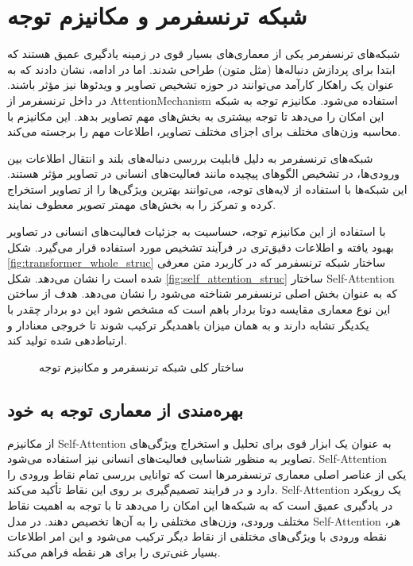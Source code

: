 \section{شبکه ترنسفرمر و مکانیزم توجه}

شبکه‌های ترنسفرمر یکی از معماری‌های بسیار قوی در زمینه یادگیری عمیق هستند که ابتدا برای پردازش دنباله‌ها (مثل متون) طراحی شدند.
\cite{AttentionIsAllNeed}
 اما در ادامه، نشان دادند که به عنوان یک راهکار کارآمد می‌توانند در حوزه تشخیص تصاویر و ویدئوها نیز مؤثر باشند. در داخل ترنسفرمر از %
\gls{AttentionMechanism}
استفاده می‌شود.
مکانیزم توجه به شبکه این امکان را می‌دهد تا توجه بیشتری به بخش‌های مهم تصاویر بدهد. این مکانیزم با محاسبه وزن‌های مختلف برای اجزای مختلف تصاویر، اطلاعات مهم را برجسته می‌کند. 

شبکه‌های ترنسفرمر به دلیل قابلیت بررسی دنباله‌های بلند و انتقال اطلاعات بین ورودی‌ها، در تشخیص الگوهای پیچیده مانند فعالیت‌های انسانی در تصاویر مؤثر هستند. این شبکه‌ها با استفاده از لایه‌های توجه، می‌توانند بهترین ویژگی‌ها را از تصاویر استخراج کرده و تمرکز را به بخش‌های مهمتر تصویر معطوف نمایند.

با استفاده از این مکانیزم توجه، حساسیت به جزئیات فعالیت‌های انسانی در تصاویر بهبود یافته و اطلاعات دقیق‌تری در فرآیند تشخیص مورد استفاده قرار می‌گیرد.
شکل%
\ref{fig:transformer_whole_struc}
 ساختار شبکه ترنسفرمر که در کاربرد متن معرفی شده است را نشان می‌دهد. شکل%
\ref{fig:self_attention_struc}
 ساختار
\gls{Self-Attention}
که به عنوان بخش اصلی ترنسفرمر شناخته می‌شود را نشان می‌دهد. هدف از ساختن این نوع معماری مقایسه دوتا بردار باهم است که مشخص شود این دو بردار چقدر با یکدیگر تشابه دارند و به همان میزان باهمدیگر ترکیب شوند تا خروجی معنادار و ارتباط‌دهی شده تولید کند.
\begin{figure}
	\centering
	
	\hfill
	
	\caption{ساختار کلی شبکه ترنسفرمر و مکانیزم توجه
		\cite{AttentionIsAllNeed}
	}
	\label{fig:mainfigure}
\end{figure}

\subsection{بهره‌مندی از معماری توجه به خود}

از مکانیزم %
\gls{Self-Attention}
 به عنوان یک ابزار قوی برای تحلیل و استخراج ویژگی‌های تصاویر به منظور شناسایی فعالیت‌های انسانی نیز استفاده می‌شود.
\gls{Self-Attention}
یکی از عناصر اصلی معماری ترنسفرمرها است که توانایی بررسی تمام نقاط ورودی را دارد و در فرایند تصمیم‌گیری بر روی این نقاط تأکید می‌کند.
\gls{Self-Attention}
یک رویکرد در یادگیری عمیق است که به شبکه‌ها این امکان را می‌دهد تا با توجه به اهمیت نقاط مختلف ورودی، وزن‌های مختلفی را به آن‌ها تخصیص دهند.
در مدل %
\gls{Self-Attention}
،هر نقطه ورودی با ویژگی‌های مختلفی از نقاط دیگر ترکیب می‌شود و این امر اطلاعات بسیار غنی‌تری را برای هر نقطه فراهم می‌کند.

